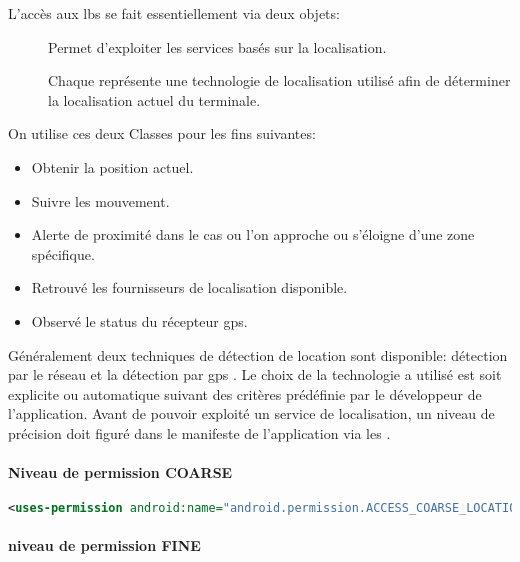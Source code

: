 L'accès aux \gls{lbs} se fait essentiellement via deux objets:
\begin{description}
\item [] Permet d'exploiter les services basés sur la localisation.
\item [] Chaque  représente une technologie de localisation utilisé afin de déterminer la localisation actuel du terminale.

\end{description}
On utilise ces deux Classes pour les fins suivantes:~\cite{pa4ad:lbs}
\begin{itemize}
\item Obtenir la position actuel.
\item Suivre les mouvement.
\item Alerte de proximité dans le cas ou l'on approche ou s’éloigne d'une zone spécifique.
\item Retrouvé les fournisseurs de localisation disponible.
\item Observé le status du récepteur \gls{gps}.
\end{itemize}
\cite{pa4ad:lbs}
Généralement deux techniques de détection de location sont disponible: détection par le réseau  et la détection par \gls{gps} . Le choix de la technologie a utilisé est soit explicite ou automatique suivant des critères prédéfinie par le développeur de l'application. Avant de pouvoir exploité un service de localisation, un niveau de précision doit figuré dans le manifeste de l'application via les  .

\paragraph{Niveau de permission \textbf{COARSE} } %
\label{par:coarse}

\begin{lstlisting}[language=xml, caption=permission pour la localisation par le réseau.]
<uses-permission android:name="android.permission.ACCESS_COARSE_LOCATION"/>
\end{lstlisting}

\paragraph{niveau de permission \textbf{FINE} } %
\label{par:fine}

